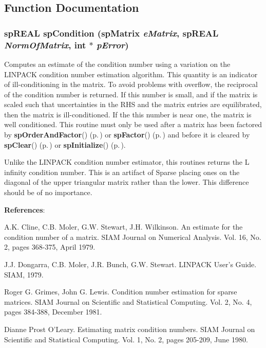 \subsection{Function Documentation}
\subsubsection{\setlength{\rightskip}{0pt plus 5cm}sp\-REAL sp\-Condition ({\bf sp\-Matrix} {\em e\-Matrix}, sp\-REAL {\em Norm\-Of\-Matrix}, int $\ast$ {\em p\-Error})}\label{spUtils_8c_a20}


Computes an estimate of the condition number using a variation on the LINPACK condition number estimation algorithm. This quantity is an indicator of ill-conditioning in the matrix. To avoid problems with overflow, the reciprocal of the condition number is returned. If this number is small, and if the matrix is scaled such that uncertainties in the RHS and the matrix entries are equilibrated, then the matrix is ill-conditioned. If the this number is near one, the matrix is well conditioned. This routine must only be used after a matrix has been factored by {\bf sp\-Order\-And\-Factor}() {\rm (p.\,\pageref{spFactor_8c_a24})} or {\bf sp\-Factor}() {\rm (p.\,\pageref{spFactor_8c_a25})} and before it is cleared by {\bf sp\-Clear}() {\rm (p.\,\pageref{spBuild_8c_a10})} or {\bf sp\-Initialize}() {\rm (p.\,\pageref{spBuild_8c_a21})}.

Unlike the LINPACK condition number estimator, this routines returns the L infinity condition number. This is an artifact of Sparse placing ones on the diagonal of the upper triangular matrix rather than the lower. This difference should be of no importance.

{\bf References}:

A.K. Cline, C.B. Moler, G.W. Stewart, J.H. Wilkinson. An estimate for the condition number of a matrix. SIAM Journal on Numerical Analysis. Vol. 16, No. 2, pages 368-375, April 1979.

J.J. Dongarra, C.B. Moler, J.R. Bunch, G.W. Stewart. LINPACK User's Guide. SIAM, 1979.

Roger G. Grimes, John G. Lewis. Condition number estimation for sparse matrices. SIAM Journal on Scientific and Statistical Computing. Vol. 2, No. 4, pages 384-388, December 1981.

Dianne Prost O'Leary. Estimating matrix condition numbers. SIAM Journal on Scientific and Statistical Computing. Vol. 1, No. 2, pages 205-209, June 1980.

